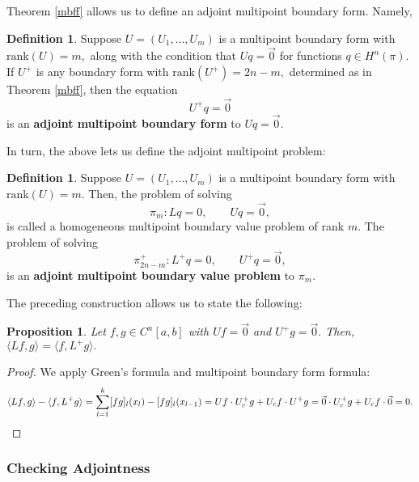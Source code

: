 \documentclass[11pt,reqno,oneside,a4paper]{article}
\theoremstyle{plain} %
\newtheorem{proposition}{Proposition}
\theoremstyle{definition}
\newtheorem{definition}[theorem]{Definition}
\theoremstyle{remark}
\begin{document}
Theorem \ref{mbff} allows us to define an adjoint multipoint boundary form. Namely, 
\newline
\begin{definition}
Suppose $U = (U_1, \ldots, U_m)$ is a multipoint boundary form with $\mathrm{rank}(U) = m,$ along with the condition that $Uq = \vec{0}$ for functions $q \in H^n(\pi).$ If $U^+$ is any boundary form with  $\mathrm{rank}(U^+) = 2n-m,$ determined as in Theorem \ref{mbff}, then the equation 
\[ 
U^+q = \vec{0}
\]
is an \textbf{adjoint multipoint boundary form} to $Uq = \vec{0}.$
\end{definition}

In turn, the above lets us define the adjoint multipoint problem:
\newline
\begin{definition}
Suppose $U = (U_1, \ldots, U_m)$ is a multipoint boundary form with $\mathrm{rank}(U) = m.$ Then, the problem of solving 
\[ \pi_m: Lq = 0, \qquad Uq = \vec{0},\] 
is called a homogeneous multipoint boundary value problem of rank $m.$ The problem of solving 
\[ \pi_{2n-m}^+: L^+q = 0, \qquad U^+q = \vec{0},\] 
is an \textbf{adjoint multipoint boundary value problem} to $\pi_m.$
\end{definition}

The preceding construction allows us to state the following:
\newline
\begin{proposition}
Let $f,g \in C^n[a,b]$ with $Uf = \vec{0}$ and $U^+g = \vec{0}.$ Then, $\langle Lf, g\rangle = \langle f, L^+g\rangle.$
\end{proposition}
\begin{proof}
We apply Green's formula and multipoint boundary form formula:
\[ \langle Lf, g\rangle - \langle f, L^+g\rangle = \sum^k_{l=1}  [fg]_l(x_l) - [fg]_l(x_{l-1}) = Uf\cdot U^+_c g + U_c f \cdot U^+ g = \vec{0}\cdot U^+_c g + U_c f \cdot \vec{0} = 0. \qedhere\]
\end{proof}

\subsubsection*{Checking Adjointness}
\end{document}
